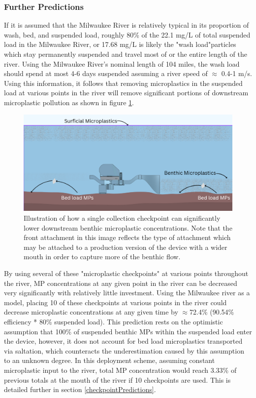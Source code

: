 \documentclass[fleqn,10pt]{SelfArx} %
\begin{document}
	\subsubsection{Further Predictions}	
	\label{sec:furtherPredictions}
	If it is assumed that the Milwaukee River is relatively typical in its proportion of wash, bed, and suspended load, roughly 80\% of the 22.1 mg/L of total suspended load in the Milwaukee River, or 17.68 mg/L is likely the "wash load"\textemdash particles which stay permanently suspended and travel most of or the entire length of the river. Using the Milwaukee River's nominal length of 104 miles, the wash load should spend at most 4-6 days suspended assuming a river speed of $\approx$ 0.4-1 m/s. 
	\linebreak
	Using this information, it follows that removing microplastics in the suspended load at various points in the river will remove significant portions of downstream microplastic pollution as shown in figure \ref{fig:washload}.
	\begin{figure}[h]
		\centering
		\includegraphics[width=1\linewidth]{Figures/WashLoadCollection}
		\caption[Wash Load MP Collection]{Illustration of how a single collection checkpoint can significantly lower downstream \gls{benthic} microplastic concentrations. Note that the front attachment in this image reflects the type of attachment which may be attached to a production version of the device with a wider mouth in order to capture more of the \gls{benthic} flow.}
		\label{fig:washload}
	\end{figure}
	By using several of these "microplastic checkpoints" at various points throughout the river, MP concentrations at any given point in the river can be decreased very significantly with relatively little investment. Using the Milwaukee river as a model, placing 10 of these checkpoints at various points in the river could decrease microplastic concentrations at any given time by $\approx$72.4\% (90.54\% efficiency * 80\% suspended load). This prediction rests on the optimistic assumption that 100\% of suspended \gls{benthic} MPs within the suspended load enter the device, however, it does not account for bed load microplastics transported via \gls{saltation}, which counteracts the underestimation caused by this assumption to an unknown degree. In this deployment scheme, assuming constant microplastic input to the river, total MP concentration would reach 3.33\% of previous totals at the mouth of the river if 10 checkpoints are used. This is detailed further in section \ref{checkpointPredictions}.
	
\end{document}
